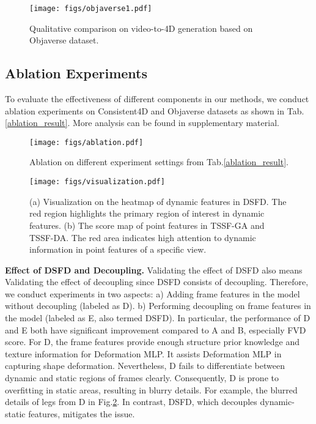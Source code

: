 \begin{figure}[h]%
\centering
\texttt{[image: figs/objaverse1.pdf]}
\caption{Qualitative comparison on video-to-4D generation based on Objaverse dataset.}\label{objaverse1}
\end{figure}

\subsection{Ablation Experiments}
To evaluate the effectiveness of different components in our methods, we conduct ablation experiments on Consistent4D and Objaverse datasets as shown in Tab.\ref{ablation_result}. More analysis can be found in supplementary material.




\begin{figure}[t]%
\centering
\texttt{[image: figs/ablation.pdf]}
\caption{Ablation on different experiment settings from Tab.\ref{ablation_result}.}\label{ablation}
\end{figure}

\begin{figure}[t]%
\centering
\texttt{[image: figs/visualization.pdf]}
\caption{(a) Visualization on the heatmap of dynamic features in DSFD. The red region highlights the primary region of interest in dynamic features. (b) The score map of point features in TSSF-GA and TSSF-DA. The red area indicates high attention to dynamic information in point features of a specific view.}\label{visualization}
\end{figure}


\textbf{Effect of DSFD and Decoupling.} Validating the effect of DSFD also means Validating the effect of decoupling since DSFD consists of decoupling. Therefore, we conduct experiments in two aspects: a) Adding frame features in the model without decoupling (labeled as D). b) Performing decoupling on frame features in the model (labeled as E, also termed DSFD). In particular, the performance of D and E both have significant improvement compared to A and B, especially FVD score. For D, the frame features provide enough structure prior knowledge and texture information for Deformation MLP. It assists Deformation MLP in capturing shape deformation. Nevertheless, D fails to differentiate between dynamic and static regions of frames clearly. Consequently, D is prone to overfitting in static areas, resulting in blurry details. For example, the blurred details of legs from D in Fig.\ref{ablation}. In contrast, DSFD, which decouples dynamic-static features, mitigates the issue.

